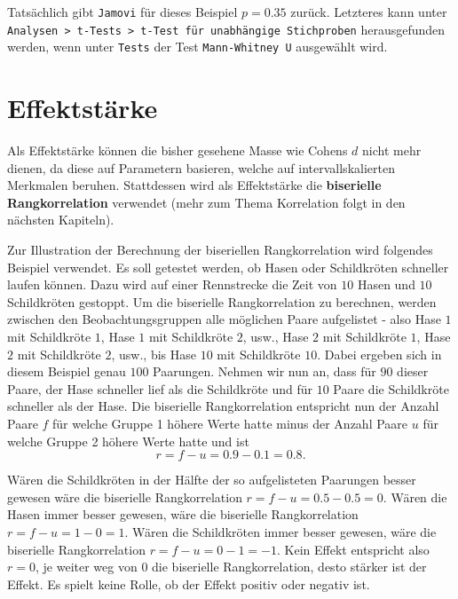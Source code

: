 \documentclass[
]{book}
\theoremstyle{definition}
\theoremstyle{definition}
\theoremstyle{definition}
\theoremstyle{definition}
\theoremstyle{remark}
\begin{document}
Tatsächlich gibt \texttt{Jamovi} für dieses Beispiel \(p = 0.35\) zurück.
Letzteres kann unter
\texttt{Analysen\ \textgreater{}\ t-Tests\ \textgreater{}\ t-Test\ für\ unabhängige\ Stichproben} herausgefunden
werden, wenn unter \texttt{Tests} der Test \texttt{Mann-Whitney\ U} ausgewählt wird.

\section{Effektstärke}\label{u-test-effect}

Als Effektstärke können die bisher gesehene Masse wie Cohens \(d\) nicht
mehr dienen, da diese auf Parametern basieren, welche auf
intervallskalierten Merkmalen beruhen. Stattdessen wird als Effektstärke
die \label{customdef-biserielle-rangkorrelation}{\textbf{biserielle
Rangkorrelation}} verwendet (mehr zum Thema Korrelation folgt in den nächsten
Kapiteln).

Zur Illustration der Berechnung der biseriellen Rangkorrelation wird
folgendes Beispiel verwendet. Es soll getestet werden, ob Hasen oder
Schildkröten schneller laufen können. Dazu wird auf einer Rennstrecke
die Zeit von \(10\) Hasen und \(10\) Schildkröten gestoppt. Um die
biserielle Rangkorrelation zu berechnen, werden zwischen den
Beobachtungsgruppen alle möglichen Paare aufgelistet - also Hase \(1\) mit
Schildkröte \(1\), Hase \(1\) mit Schildkröte \(2\), usw., Hase \(2\) mit
Schildkröte \(1\), Hase \(2\) mit Schildkröte \(2\), usw., bis Hase \(10\) mit
Schildkröte \(10\). Dabei ergeben sich in diesem Beispiel genau \(100\)
Paarungen. Nehmen wir nun an, dass für \(90\) dieser Paare, der Hase
schneller lief als die Schildkröte und für \(10\) Paare die Schildkröte
schneller als der Hase. Die biserielle Rangkorrelation entspricht nun
der Anzahl Paare \(f\) für welche Gruppe 1 höhere Werte hatte minus der
Anzahl Paare \(u\) für welche Gruppe 2 höhere Werte hatte und ist
\[r = f - u = 0.9 - 0.1 = 0.8.\]

Wären die Schildkröten in der Hälfte der so aufgelisteten Paarungen
besser gewesen wäre die biserielle Rangkorrelation
\(r = f-u=0.5 - 0.5 = 0\). Wären die Hasen immer besser gewesen, wäre die
biserielle Rangkorrelation \(r = f-u = 1-0 = 1\). Wären die Schildkröten
immer besser gewesen, wäre die biserielle Rangkorrelation
\(r = f-u = 0-1 = -1\). Kein Effekt entspricht also \(r = 0\), je weiter weg
von \(0\) die biserielle Rangkorrelation, desto stärker ist der Effekt. Es
spielt keine Rolle, ob der Effekt positiv oder negativ ist.
\end{document}

